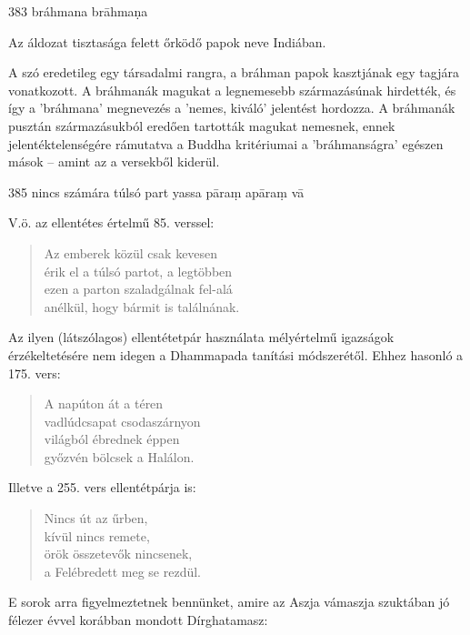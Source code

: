 
\begin{notesdescription}

\item[{383}
{bráhmana}
{brāhmaṇa}] \hfill\par

Az áldozat tisztasága felett őrködő papok neve Indiában.

A szó eredetileg egy társadalmi rangra, a bráhman papok kasztjának egy tagjára vonatkozott. A bráhmanák magukat a legnemesebb származásúnak hirdették, és így a 'bráhmana' megnevezés a 'nemes, kiváló' jelentést hordozza. A bráhmanák pusztán származásukból eredően tartották magukat nemesnek, ennek jelentéktelenségére rámutatva a Buddha kritériumai a 'bráhmanságra' egészen mások -- amint az a versekből kiderül.

\item[{385}
{nincs számára túlsó part}
{yassa pāraṃ apāraṃ vā}] \hfill\par

V.ö. az ellentétes értelmű 85. verssel:

\begin{verse}
Az emberek közül csak kevesen\\
érik el a túlsó partot, a legtöbben\\
ezen a parton szaladgálnak fel-alá\\
anélkül, hogy bármit is találnának.
\end{verse}

Az ilyen (látszólagos) ellentétetpár használata mélyértelmű igazságok érzékeltetésére nem idegen a Dhammapada tanítási módszerétől. Ehhez hasonló a 175. vers:

\begin{verse}
A napúton át a téren\\
vadlúdcsapat csodaszárnyon\\
világból ébrednek éppen\\
győzvén bölcsek a Halálon.
\end{verse}

Illetve a 255. vers ellentétpárja is:

\begin{verse}
Nincs út az űrben,\\
kívül nincs remete,\\
örök összetevők nincsenek,\\
a Felébredett meg se rezdül.
\end{verse}

E sorok arra figyelmeztetnek bennünket, amire az Aszja vámaszja szuktában jó félezer évvel korábban mondott Dírghatamasz:


\end{notesdescription}
